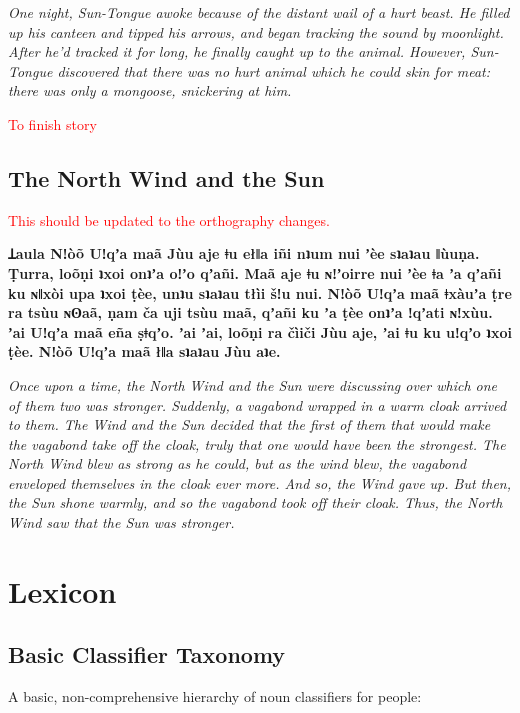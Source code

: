 \documentclass[11pt,a5paper]{book}
\newcommand{\qcn}[1]{\textcolor{AccentText}{\large\textbf{#1}}}
\newcommand{\prose}[1]{\begin{center}\begin{minipage}{0.8\textwidth}\large #1\end{minipage}\end{center}}
\newcommand{\cmnt}[1]{\textcolor{red}{#1}}
\begin{document}
\prose{\emph{One night, Sun-Tongue awoke because of the distant wail of a hurt beast. He filled up his canteen and tipped his arrows, and began tracking the sound by moonlight. After he'd tracked it for long, he finally caught up to the animal. However, Sun-Tongue discovered that there was no hurt animal which he could skin for meat: there was only a mongoose, snickering at him.}}

\cmnt{To finish story}



\section{The North Wind and the Sun}

\cmnt{This should be updated to the orthography changes.}



\prose{\qcn{Ʇaula Nǃòõ Uǃqʼa maã Jùu aje ǂu ełǁa iñi
nʇum nui ʼèe sʇaʇau ǁùuṇa.
Ṭurra, loõṇi ʇxoi onʇʼa oǃʼo qʼañi.
Maã aje ǂu ɴǃʼoirre nui ʼèe ǂa ʼa qʼañi ku ɴǁxòi upa ʇxoi ṭèe,
unʇu sʇaʇau tłìi šǃu nui.
Nǃòõ Uǃqʼa maã ǂxàuʼa ṭre ra tsùu ɴʘaã,
ṇam ča uji tsùu maã, qʼañi ku ʼa ṭèe onʇʼa ǃqʼati ɴǃxùu.
ʼai Uǃqʼa maã eña ṣǂqʼo.
ʼai ʼai, loõṇi ra čìiči Jùu aje, ʼai ǂu ku uǃqʼo ʇxoi ṭèe.
Nǃòõ Uǃqʼa maã łǁa sʇaʇau Jùu aʇe.}}

\prose{\emph{Once upon a time, the North Wind and the Sun were discussing over which one of them two was stronger. Suddenly, a vagabond wrapped in a warm cloak arrived to them.  The Wind and the Sun decided that the first of them that would make the vagabond take off the cloak, truly that one would have been the strongest.  The North Wind blew as strong as he could, but as the wind blew, the vagabond enveloped themselves in the cloak ever more. And so, the Wind gave up. But then, the Sun shone warmly, and so the vagabond took off their cloak. Thus, the North Wind saw that the Sun was stronger.}}




\chapter{Lexicon}

\section{Basic Classifier Taxonomy}

A basic, non-comprehensive hierarchy of noun classifiers for people:
\end{document}
